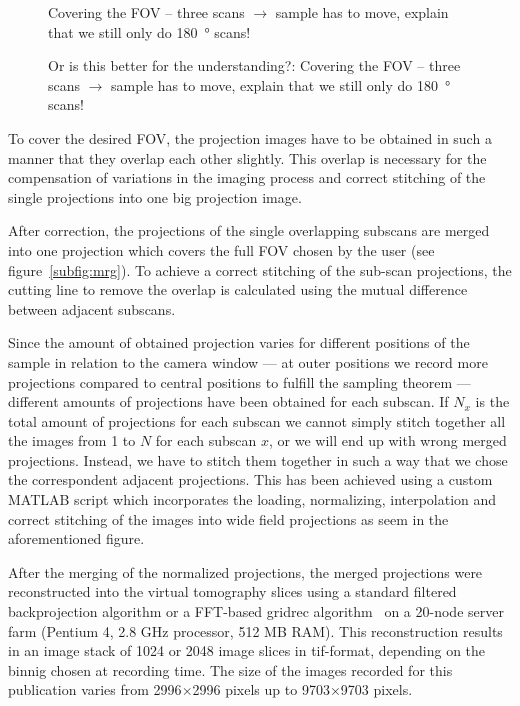 \begin{figure*}[tb]
	\centering
	
	\caption{Covering the FOV -- three scans $\rightarrow$ sample has to move, explain that we still only do \SI{180}{\degree} scans!}
	\label{fig:covering-three scans a}
\end{figure*}

\begin{figure*}[tb]
	\centering
	
	\caption{Or is this better for the understanding?: Covering the FOV -- three scans $\rightarrow$ sample has to move, explain that we still only do \SI{180}{\degree} scans!}
	\label{fig:covering-three scans b}
\end{figure*}

To cover the desired FOV, the projection images have to be obtained in such a manner that they overlap each other slightly. This overlap is necessary for the compensation of variations in the imaging process and correct stitching of the single projections into one big projection image. 

After correction, the projections of the single overlapping subscans are merged into one projection which covers the full FOV chosen by the user (see figure~\ref{subfig:mrg}). To achieve a correct stitching of the sub-scan projections, the cutting line to remove the overlap is calculated using the mutual difference between adjacent subscans.

Since the amount of obtained projection varies for different positions of the sample in relation to the camera window --- at outer positions we record more projections compared to central positions to fulfill the sampling theorem --- different amounts of projections have been obtained for each subscan. If $N_x$ is the total amount of projections for each subscan we cannot simply stitch together all the images from 1 to $N$ for each subscan $x$, or we will end up with wrong merged projections. Instead, we have to stitch them together in such a way that we chose the correspondent adjacent projections.  This has been achieved using a custom MATLAB\textsuperscript{\textregistered} script which incorporates the loading, normalizing, interpolation and correct stitching of the images into wide field projections as seem in the aforementioned figure.

After the merging of the normalized projections, the merged projections were reconstructed into the virtual tomography slices using a standard filtered backprojection algorithm or a FFT-based gridrec algorithm~\cite{Dowd2003} on a 20-node server farm (Pentium 4, 2.8 GHz processor, 512 MB RAM). This reconstruction results in an image stack of 1024 or 2048 image slices in tif-format, depending on the binnig chosen at recording time. The size of the images recorded for this publication varies from 2996$\times$2996 pixels up to 9703$\times$9703 pixels.